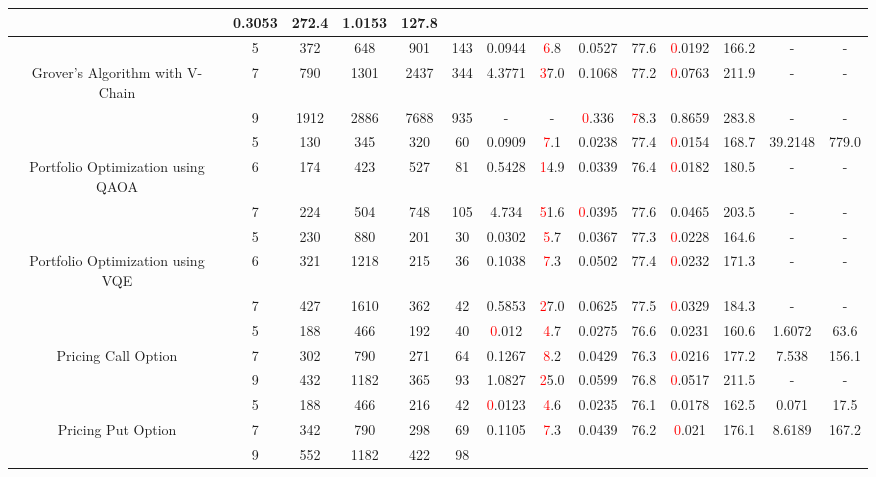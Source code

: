 \begin{table}[htb]
{\begin{tabular}{|c|c|c|c|c|c|c|c|c|c|c|c|c|c|}
 & 0.3053 & 272.4
 & 1.0153 & 127.8
 \\
\hline
 & 
5 & 372 & 648 & 901 & 143
 & 0.0944 & \textcolor{red}6.8
 & 0.0527 & 77.6
 & \textcolor{red}0.0192 & 166.2
 & - & -
 \\
Grover's Algorithm with V-Chain & 
7 & 790 & 1301 & 2437 & 344
 & 4.3771 & \textcolor{red}37.0
 & 0.1068 & 77.2
 & \textcolor{red}0.0763 & 211.9
 & - & -
 \\
 & 
9 & 1912 & 2886 & 7688 & 935
 & - & -
 & \textcolor{red}0.336 & \textcolor{red}78.3
 & 0.8659 & 283.8
 & - & -
 \\
\hline
 & 
5 & 130 & 345 & 320 & 60
 & 0.0909 & \textcolor{red}7.1
 & 0.0238 & 77.4
 & \textcolor{red}0.0154 & 168.7
 & 39.2148 & 779.0
 \\
Portfolio Optimization using QAOA & 
6 & 174 & 423 & 527 & 81
 & 0.5428 & \textcolor{red}14.9
 & 0.0339 & 76.4
 & \textcolor{red}0.0182 & 180.5
 & - & -
 \\
 & 
7 & 224 & 504 & 748 & 105
 & 4.734 & \textcolor{red}51.6
 & \textcolor{red}0.0395 & 77.6
 & 0.0465 & 203.5
 & - & -
 \\
\hline
 & 
5 & 230 & 880 & 201 & 30
 & 0.0302 & \textcolor{red}5.7
 & 0.0367 & 77.3
 & \textcolor{red}0.0228 & 164.6
 & - & -
 \\
Portfolio Optimization using VQE & 
6 & 321 & 1218 & 215 & 36
 & 0.1038 & \textcolor{red}7.3
 & 0.0502 & 77.4
 & \textcolor{red}0.0232 & 171.3
 & - & -
 \\
 & 
7 & 427 & 1610 & 362 & 42
 & 0.5853 & \textcolor{red}27.0
 & 0.0625 & 77.5
 & \textcolor{red}0.0329 & 184.3
 & - & -
 \\
\hline
 & 
5 & 188 & 466 & 192 & 40
 & \textcolor{red}0.012 & \textcolor{red}4.7
 & 0.0275 & 76.6
 & 0.0231 & 160.6
 & 1.6072 & 63.6
 \\
Pricing Call Option & 
7 & 302 & 790 & 271 & 64
 & 0.1267 & \textcolor{red}8.2
 & 0.0429 & 76.3
 & \textcolor{red}0.0216 & 177.2
 & 7.538 & 156.1
 \\
 & 
9 & 432 & 1182 & 365 & 93
 & 1.0827 & \textcolor{red}25.0
 & 0.0599 & 76.8
 & \textcolor{red}0.0517 & 211.5
 & - & -
 \\
\hline
 & 
5 & 188 & 466 & 216 & 42
 & \textcolor{red}0.0123 & \textcolor{red}4.6
 & 0.0235 & 76.1
 & 0.0178 & 162.5
 & 0.071 & 17.5
 \\
Pricing Put Option & 
7 & 342 & 790 & 298 & 69
 & 0.1105 & \textcolor{red}7.3
 & 0.0439 & 76.2
 & \textcolor{red}0.021 & 176.1
 & 8.6189 & 167.2
 \\
 & 
9 & 552 & 1182 & 422 & 98

\end{tabular}}
\end{table}
